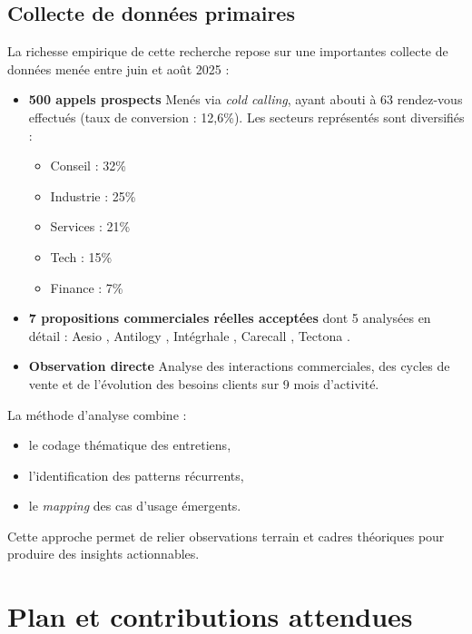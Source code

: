 \subsection{Collecte de données primaires}
La richesse empirique de cette recherche repose sur une importantes collecte de données menée entre juin et août 2025 :
\medskip
\begin{itemize}
    \item \textbf{500 appels prospects}  
    Menés via \textit{cold calling}, ayant abouti à 63 rendez-vous effectués (taux de conversion : 12,6\%).  
    Les secteurs représentés sont diversifiés : 
    \begin{itemize}
        \item Conseil : 32\%
        \item Industrie : 25\%
        \item Services : 21\%
        \item Tech : 15\%
        \item Finance : 7\%
    \end{itemize}

    \item \textbf{7 propositions commerciales réelles acceptées} dont 5 analysées en détail :  
    Aesio \cite{luwai2025aesio}, Antilogy \cite{luwai2025antilogy}, Intégrhale \cite{luwai2025integrhale}, Carecall \cite{luwai2025carecall}, Tectona \cite{luwai2025tectona}.
    
    \item \textbf{Observation directe}  
    Analyse des interactions commerciales, des cycles de vente et de l’évolution des besoins clients sur 9 mois d’activité.
\end{itemize}

\medskip
La méthode d’analyse combine :
\begin{itemize}
    \item le codage thématique des entretiens,
    \item l’identification des patterns récurrents,
    \item le \textit{mapping} des cas d’usage émergents.
\end{itemize}
\medskip
Cette approche permet de relier observations terrain et cadres théoriques pour produire des insights actionnables.

\section{Plan et contributions attendues}


